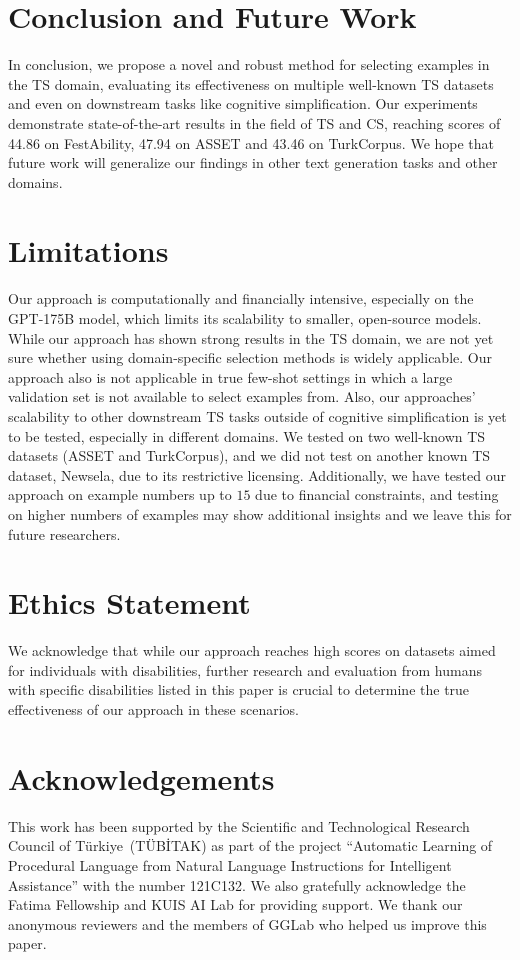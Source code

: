 \documentclass[11pt]{article}
\begin{document}
\section{Conclusion and Future Work}
In conclusion, we propose a novel and robust method for selecting examples in the TS domain, evaluating its effectiveness on multiple well-known TS datasets and even on downstream tasks like cognitive simplification. Our experiments demonstrate state-of-the-art results in the field of TS and CS, reaching scores of 44.86 on FestAbility, 47.94 on ASSET and 43.46 on TurkCorpus. We hope that future work will generalize our findings in other text generation tasks and other domains. 

\section*{Limitations}

Our approach is computationally and financially intensive, especially on the GPT-175B model, which limits its scalability to smaller, open-source models. While our approach has shown strong results in the TS domain, we are not yet sure whether using domain-specific selection methods is widely applicable. Our approach also is not applicable in true few-shot settings in which a large validation set is not available to select examples from. Also, our approaches' scalability to other downstream TS tasks outside of cognitive simplification is yet to be tested, especially in different domains. We tested on two well-known TS datasets (ASSET and TurkCorpus), and we did not test on another known TS dataset, Newsela, due to its restrictive licensing. Additionally, we have tested our approach on example numbers up to $15$ due to financial constraints, and testing on higher numbers of examples may show additional insights and we leave this for future researchers.


\section*{Ethics Statement}
We acknowledge that while our approach reaches high scores on datasets aimed for individuals with disabilities, further research and evaluation from humans with specific disabilities listed in this paper is crucial to determine the true effectiveness of our approach in these scenarios.


\section*{Acknowledgements}
This work has been supported by the Scientific and Technological Research Council of Türkiye~(TÜBİTAK) as part of the project ``Automatic Learning of Procedural Language from Natural Language Instructions for Intelligent Assistance'' with the number 121C132. We also gratefully acknowledge the Fatima Fellowship and KUIS AI Lab for providing support. We thank our anonymous reviewers and the members of GGLab who helped us improve this paper. 
\end{document}
